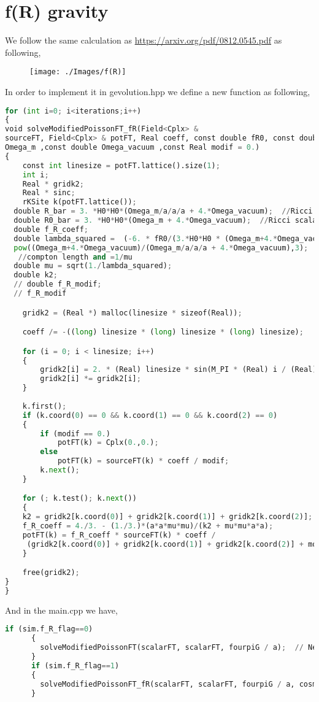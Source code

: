 \documentclass[a4paper,10pt]{article}
\begin{document}
\section{f(R) gravity}
We follow the same calculation as \url{https://arxiv.org/pdf/0812.0545.pdf} as following,
    \begin{figure}[H]
 \texttt{[image: ./Images/f(R)]}  
 \end{figure} 
 In order to implement it in gevolution.hpp we define a new function as following,
 \lstset {language=python}
\begin{lstlisting}[basicstyle=\tiny,frame=single,
    language=python]
for (int i=0; i<iterations;i++)
{
void solveModifiedPoissonFT_fR(Field<Cplx> & 
sourceFT, Field<Cplx> & potFT, Real coeff, const double fR0, const double a, const double H0 ,const double 
Omega_m ,const double Omega_vacuum ,const Real modif = 0.)
{
	const int linesize = potFT.lattice().size(1);
	int i;
	Real * gridk2;
	Real * sinc;
	rKSite k(potFT.lattice());
  double R_bar = 3. *H0*H0*(Omega_m/a/a/a + 4.*Omega_vacuum);  //Ricci scalar Bg
  double R0_bar = 3. *H0*H0*(Omega_m + 4.*Omega_vacuum);  //Ricci scalar at z=0 Bg
  double f_R_coeff;
  double lambda_squared =  (-6. * fR0/(3.*H0*H0 * (Omega_m+4.*Omega_vacuum))) * 
  pow((Omega_m+4.*Omega_vacuum)/(Omega_m/a/a/a + 4.*Omega_vacuum),3);
   //compton length and =1/mu
  double mu = sqrt(1./lambda_squared);
  double k2;
  // double f_R_modif;
  // f_R_modif

	gridk2 = (Real *) malloc(linesize * sizeof(Real));

	coeff /= -((long) linesize * (long) linesize * (long) linesize);

	for (i = 0; i < linesize; i++)
	{
		gridk2[i] = 2. * (Real) linesize * sin(M_PI * (Real) i / (Real) linesize);
		gridk2[i] *= gridk2[i];
	}
  
	k.first();
	if (k.coord(0) == 0 && k.coord(1) == 0 && k.coord(2) == 0)
	{
		if (modif == 0.)
			potFT(k) = Cplx(0.,0.);
		else
			potFT(k) = sourceFT(k) * coeff / modif;
		k.next();
	}

	for (; k.test(); k.next())
	{
    k2 = gridk2[k.coord(0)] + gridk2[k.coord(1)] + gridk2[k.coord(2)];
    f_R_coeff = 4./3. - (1./3.)*(a*a*mu*mu)/(k2 + mu*mu*a*a);
    potFT(k) = f_R_coeff * sourceFT(k) * coeff /
     (gridk2[k.coord(0)] + gridk2[k.coord(1)] + gridk2[k.coord(2)] + modif);
	}

	free(gridk2);
}
}
\end{lstlisting}
And in the main.cpp we have,
 \lstset {language=python}
\begin{lstlisting}[basicstyle=\tiny,frame=single,
    language=python]
    if (sim.f_R_flag==0)
      {
        solveModifiedPoissonFT(scalarFT, scalarFT, fourpiG / a);  // Newton: phi update (k-space)
      }
      if (sim.f_R_flag==1)
      {
        solveModifiedPoissonFT_fR(scalarFT, scalarFT, fourpiG / a, cosmo.fR0, a, Hconf(1., fourpiG, cosmo) , cosmo.Omega_m , cosmo.Omega_Lambda );
      }
     \end{lstlisting}
\end{document}
